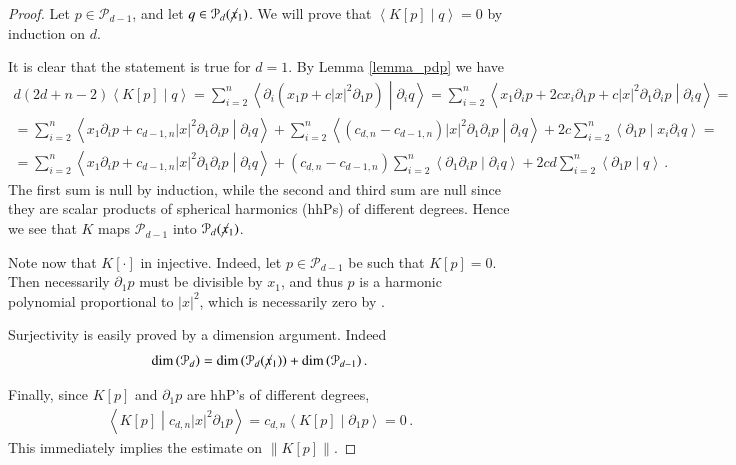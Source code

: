 \documentclass[11pt]{article}
\begin{document}
\begin{proof}
 Let $p\in {\mathcal{P}}_{d-1}$, and let $q\in {\mathcal{P}}_d(\cancel x_1)$. We will prove that ${\left\langle{K[p]}\middle\vert{q}\right\rangle}=0$ by induction on $d$. 
 
 It is clear that the statement is true for $d=1$.  By Lemma \ref{lemma_pdp} we have
 \begin{gather}
 d(2d+n-2) {\left\langle{K[p]}\middle\vert{q}\right\rangle}= \sum_{i=2}^n{\left\langle{\partial_i {\left({x_1p +c {\left|x\right|}^2 \partial_1 p}\right)} }\middle\vert{\partial_i q}\right\rangle}=\sum_{i=2}^n {\left\langle{x_1\partial_i p +2cx_i \partial_1p +c{\left|x\right|}^2 \partial_1\partial_i p  }\middle\vert{\partial_i q}\right\rangle}=\\
 =\sum_{i=2}^n {\left\langle{x_1\partial_i p +c_{d-1,n}{\left|x\right|}^2 \partial_1\partial_i p  }\middle\vert{\partial_i q}\right\rangle} + \sum_{i=2}^n {\left\langle{{\left({c_{d,n}-c_{d-1,n}}\right)}{\left|x\right|}^2 \partial_1\partial_i p  }\middle\vert{\partial_i q}\right\rangle} + 2c\sum_{i=2}^n {\left\langle{\partial_1p}\middle\vert{x_i\partial_i q}\right\rangle}=\\
 =\sum_{i=2}^n {\left\langle{x_1\partial_i p +c_{d-1,n}{\left|x\right|}^2 \partial_1\partial_i p  }\middle\vert{\partial_i q}\right\rangle} + {\left({c_{d,n}-c_{d-1,n}}\right)}\sum_{i=2}^n {\left\langle{ \partial_1\partial_i p  }\middle\vert{\partial_i q}\right\rangle} + 2cd\sum_{i=2}^n {\left\langle{\partial_1p}\middle\vert{q}\right\rangle}\, .
 \end{gather}
The first sum is null by induction, while the second and third sum are null since they are scalar products of spherical harmonics (hhPs) of different degrees.  Hence we see that $K$ maps ${\mathcal{P}}_{d-1}$ into ${\mathcal{P}}_d(\cancel x_1)$.

Note now that $K[\cdot]$ in injective. Indeed, let $p\in {\mathcal{P}}_{d-1}$ be such that $K[p]=0$. Then necessarily $\partial_1 p$ must be divisible by $x_1$, and thus $p$ is a harmonic polynomial proportional to ${\left|x\right|}^2$, which is necessarily zero by \cite[corollary 5.3]{HFT}.

Surjectivity is easily proved by a dimension argument. Indeed
\begin{gather}
 \dim{\left({{\mathcal{P}}_d}\right)} = \dim{\left({{\mathcal{P}}_{d}(\cancel x_1)}\right)} + \dim{\left({{\mathcal{P}}_{d-1}}\right)}\, .
\end{gather}

Finally, since $K[p]$ and $\partial_1 p$ are hhP's of different degrees,
\begin{gather}
 {\left\langle{K[p]}\middle\vert{c_{d,n}{\left|{x}\right|}^2 \partial_1 p }\right\rangle}= c_{d,n}{\left\langle{K[p]}\middle\vert{\partial_1 p }\right\rangle}=0\, .
\end{gather}
This immediately implies the estimate on ${\left\|{K[p]}\right\|}$.
\end{proof}
\end{document}
